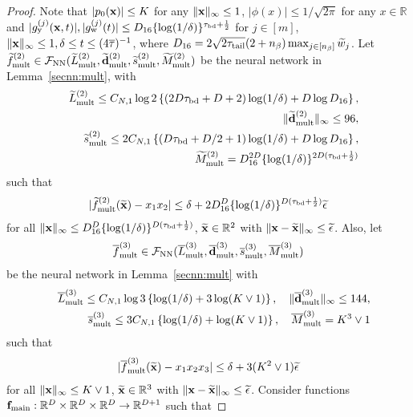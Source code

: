 \documentclass[twoside,11pt]{article}
\def\cF{\mathcal F}
\newcommand{\bd}{{\bf d}}
\newcommand{\bff}{{\bf f}}
\newcommand{\bx}{{\bf x}}
\newcommand{\bbR}{{\mathbb R}}
\newcommand{\bean}{\setlength\arraycolsep{1pt}\begin{eqnarray*}}
\newcommand{\eean}{\end{eqnarray*}}
\begin{document}
\begin{proof}
Note that $\vert p_0(\bx) \vert \leq K$ for any $\|\bx\|_{\infty} \leq 1$, $\vert \phi(x) \vert \leq  1/\sqrt{2\pi}$ for any $x \in \bbR$ and $\vert g_{\rm y}^{(j)}(\bx,t)\vert, \vert g_{\rm w}^{(j)}(t) \vert \leq D_{16} \{\log(1/\delta)\}^{\tau_{\rm bd}+\frac{1}{2}}$ for $j \in [m]$, $\|\bx\|_{\infty} \leq 1, \delta \leq t \leq (4 \overline{\tau})^{-1}$, where $D_{16} = 2\sqrt{2\tau_{\rm tail}} (2 + {n_{\beta}}) \max_{j \in [{n_{\beta}}]} \widetilde w_j$.
Let
$\widetilde{f}_{\rm mult}^{(2)} \in \cF_{\rm NN}(\widetilde{L}_{\rm mult}^{(2)} ,\widetilde{\bd}_{\rm mult}^{(2)} ,\widetilde{s}_{\rm mult}^{(2)} ,\widetilde{M}_{\rm mult}^{(2)} )$ be the neural network in Lemma~\ref{secnn:mult}, 
with
\bean
&& \widetilde{L}_{\rm mult}^{(2)} \leq C_{N,1} \log 2 \left\{ (2D\tau_{\rm bd}+D +2) \log(1/\delta)+ D \log D_{16} \right\},
\\
&& \| \widetilde{\bd}_{\rm mult}^{(2)}\|_{\infty} \leq 96,
\\
&& \widetilde{s}_{\rm mult}^{(2)} \leq 2 C_{N,1} \left\{(D\tau_{\rm bd}+D/2+1) \log(1/\delta) + D\log D_{16}   \right\},
\\
&& \widetilde{M}_{\rm mult}^{(2)} = D_{16}^{2D} \{ \log(1/\delta) \}^{2D(\tau_{\rm bd}+\frac{1}{2})}
\eean
such that 
\bean
\vert \widetilde{f}_{\rm mult}^{(2)}(\widetilde \bx) - x_1 x_2 \vert \leq \delta + 2D_{16}^{D} \{ \log(1/\delta) \}^{D(\tau_{\rm bd}+\frac{1}{2})}  \widetilde \epsilon
\eean
for all $\| \bx\|_{\infty} \leq D_{16}^{D} \{ \log(1/\delta) \}^{D(\tau_{\rm bd}+\frac{1}{2})}$, $\widetilde \bx \in \bbR^2$ with $\| \bx - \widetilde \bx \|_{\infty} \leq \widetilde \epsilon$.
Also, let 
\bean
\overline{f}_{\rm mult}^{(3)} \in \cF_{\rm NN} ( \overline{L}_{\rm mult}^{(3)} ,  \overline{\bd}_{\rm mult}^{(3)} , \overline{s}_{\rm mult}^{(3)} ,\overline{M}_{\rm mult}^{(3)} )
\eean
be the neural network in Lemma~\ref{secnn:mult} with
\bean
&& \overline{L}_{\rm mult}^{(3)} \leq C_{N,1} \log 3 \left\{\log(1/\delta) + 3 \log  (K\vee1) \right\}, \quad \| \overline{\bd}_{\rm mult}^{(3)} \|_
{\infty} \leq 144,
\\
&& \overline{s}_{\rm mult}^{(3)} \leq 3 C_{N,1} \left\{\log(1/\delta) +  \log  (K\vee1) \right\}, \quad \overline{M}_{\rm mult}^{(3)} = K^{3} \vee 1
\eean
such that 
\bean
\vert \overline{f}_{\rm mult}^{(3)}(\widetilde \bx) - x_1 x_2 x_3 \vert \leq \delta + 3(K^2 \vee 1)\widetilde \epsilon
\eean
for all $\|\bx\|_{\infty} \leq K \vee 1$, $\widetilde \bx \in \bbR^3$ with $\| \bx - \widetilde \bx \|_{\infty} \leq \widetilde \epsilon$.
Consider functions $\bff_{\rm main} : \bbR^{D} \times \bbR^{D} \times \bbR^{D} \to \bbR^{D+1}$ such that

\end{proof}
\end{document}
